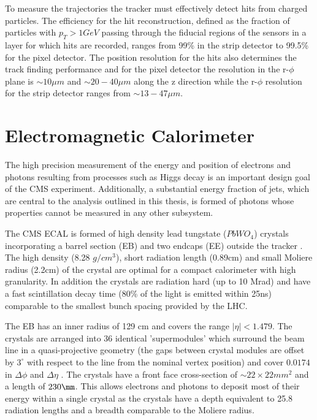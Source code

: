 To measure the trajectories the tracker must effectively detect hits from charged particles. The efficiency for the 
hit reconstruction, defined as the fraction of particles with $p_T > 1 GeV$ passing through the fiducial regions of the sensors
in a layer for which hits are recorded, ranges from 99\% in the strip detector to 99.5\% for the pixel detector.
The position resolution for the hits also determines the track finding performance and for 
the pixel detector the resolution in the r-$\phi$ plane is $\sim10\mu m$ and $\sim20-40\mu m$ along
the z direction while the r-$\phi$ resolution for the strip detector ranges from $\sim13-47\mu m$.

\section{Electromagnetic Calorimeter}

The high precision measurement of the energy and position of electrons and photons resulting from 
processes such as Higgs decay is an important design goal of the CMS experiment. Additionally,
a substantial energy fraction of jets, which are central to the analysis outlined in this
thesis, is formed of photons whose properties cannot be measured in any other subsystem.

The CMS ECAL is formed of high density lead tungstate ($PbWO_4$) crystals incorporating a barrel section (EB) 
and two endcaps (EE) outside the tracker \cite{ecal_tdr}. The high density (8.28 $g/cm^3$), short radiation length (0.89cm) 
and small Moliere radius (2.2cm) of the crystal are optimal for a compact calorimeter with high granularity. In addition the 
crystals are radiation hard (up to 10 Mrad) and have a fast scintillation decay time (80\% of the light is emitted within 25ns)
comparable to the smallest bunch spacing provided by the LHC. 

The EB has an inner radius of 129 cm and covers the range $|\eta| < 1.479$. The crystals are arranged into 36 
identical 'supermodules' which surround the beam line in a quasi-projective geometry (the gaps between
crystal modules are offset by $3^\circ$ with respect to the line from the nominal vertex position)
and cover $0.0174$ in $\Delta\phi$ and $\Delta\eta$ \cite{CMS}. The crystals have a front face cross-section 
of $\sim 22\times22mm^2$ and a length of $230\mm$. This allows electrons and photons to deposit most of their  
energy within a single crystal as the crystals have a depth equivalent to 25.8 radiation lengths and 
a breadth comparable to the Moliere radius. 

